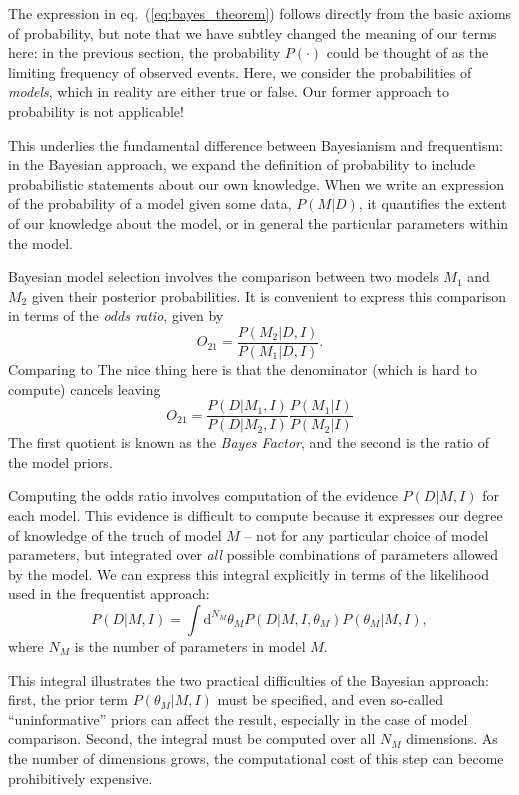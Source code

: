 \documentclass[12pt]{article}
\newcommand{\dd}{\mathrm{d}}
\newcommand{\eqn}[1]{eq.~(\ref{eq:#1})}
\begin{document}
The expression in \eqn{bayes_theorem} follows directly from the basic axioms
of probability, but note that
we have subtley changed the meaning of our terms here:
in the previous section, the probability
$P(\cdot)$ could be thought of as the limiting frequency of observed events.
Here, we consider the probabilities of {\it models}, which in reality are
either true or false.  Our former approach to probability is not applicable!

This underlies the fundamental difference between Bayesianism and frequentism:
in the Bayesian approach, we expand the definition of probability to include
probabilistic statements about our own knowledge.  When we write an expression
of the probability of a model given some data, $P(M|D)$, it quantifies the
extent of our knowledge about the model, or in general the particular
parameters within the model.

Bayesian model selection involves the comparison between two models $M_1$
and $M_2$ given their posterior probabilities.  It is convenient to express
this comparison in terms of the {\it odds ratio}, given by
\begin{equation}
  \label{eq:odds_ratio}
  O_{21} = \frac{P(M_2|D,I)}{P(M_1|D,I)}.
\end{equation}
Comparing to
The nice thing here is that the denominator (which is hard to compute) cancels
leaving
\begin{equation}
  O_{21} = \frac{P(D|M_1,I)}{P(D|M_2,I)}\frac{P(M_1|I)}{P(M_2|I)}
\end{equation}
The first quotient is known as the {\it Bayes Factor}, and the second is the
ratio of the model priors.

Computing the odds ratio involves computation of the evidence $P(D|M,I)$
for each model.  This evidence is difficult to compute because it expresses
our degree of knowledge of the truch of model $M$ -- not for any
particular choice of model parameters,
but integrated over {\it all} possible combinations of parameters allowed
by the model.  We can express this integral explicitly in terms of the
likelihood used in the frequentist approach:
\begin{equation}
  \label{eq:evidence_integral}
  P(D|M, I) = \int \dd^{N_M}\theta_M P(D|M, I, \theta_M)P(\theta_M|M, I),
\end{equation}
where $N_M$ is the number of parameters in model $M$.

This integral illustrates the two practical difficulties of the Bayesian
approach: first, the prior term $P(\theta_M|M,I)$ must be specified, and
even so-called ``uninformative'' priors can affect the result, especially
in the case of model comparison.  Second, the integral must be computed
over all $N_M$ dimensions.
As the number of dimensions grows, the computational cost of this step
can become prohibitively expensive.
\end{document}
